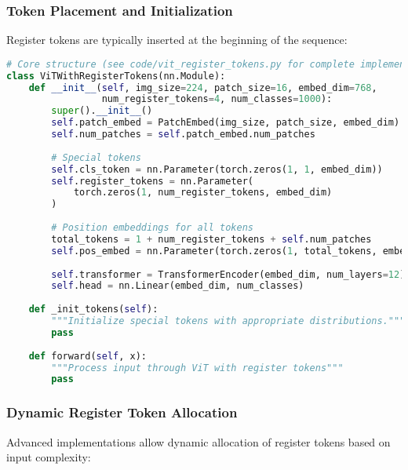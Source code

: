 \subsubsection{Token Placement and Initialization}

Register tokens are typically inserted at the beginning of the sequence:

\begin{lstlisting}[language=Python, caption=Register token integration in Vision Transformer]
# Core structure (see code/vit_register_tokens.py for complete implementation)
class ViTWithRegisterTokens(nn.Module):
    def __init__(self, img_size=224, patch_size=16, embed_dim=768, 
                 num_register_tokens=4, num_classes=1000):
        super().__init__()
        self.patch_embed = PatchEmbed(img_size, patch_size, embed_dim)
        self.num_patches = self.patch_embed.num_patches
        
        # Special tokens
        self.cls_token = nn.Parameter(torch.zeros(1, 1, embed_dim))
        self.register_tokens = nn.Parameter(
            torch.zeros(1, num_register_tokens, embed_dim)
        )
        
        # Position embeddings for all tokens
        total_tokens = 1 + num_register_tokens + self.num_patches
        self.pos_embed = nn.Parameter(torch.zeros(1, total_tokens, embed_dim))
        
        self.transformer = TransformerEncoder(embed_dim, num_layers=12)
        self.head = nn.Linear(embed_dim, num_classes)
    
    def _init_tokens(self):
        """Initialize special tokens with appropriate distributions."""
        pass
    
    def forward(self, x):
        """Process input through ViT with register tokens"""
        pass
\end{lstlisting}

\subsubsection{Dynamic Register Token Allocation}

Advanced implementations allow dynamic allocation of register tokens based on input complexity:

